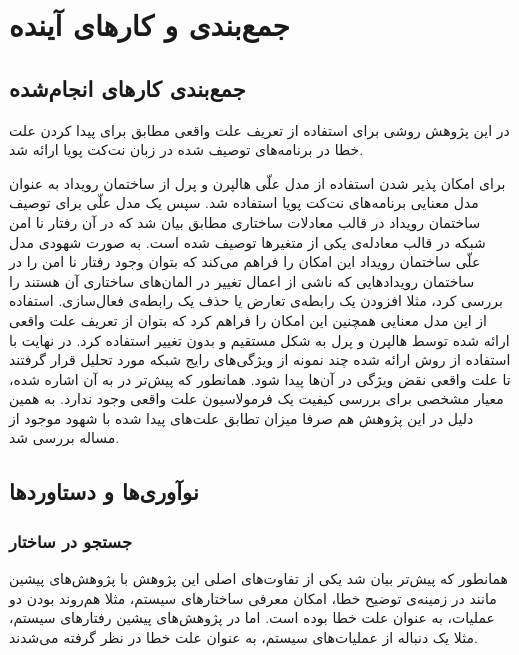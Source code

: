 \chapter{جمع‌بندی و کار‌های آینده}
\section{جمع‌بندی کار‌های انجام‌شده}
 در این پژوهش روشی برای استفاده از تعریف علت واقعی مطابق
\cite{hp}
برای پیدا کردن علت خطا در برنامه‌های توصیف شده در زبان نت‌کت پویا ارائه شد.

برای امکان پذیر شدن استفاده از مدل علّی هالپرن و پرل از ساختمان رویداد به عنوان مدل معنایی برنامه‌های نت‌کت پویا استفاده شد.
سپس یک مدل علّی برای توصیف ساختمان رویداد در قالب معادلات ساختاری مطابق
\cite{hp}
بیان شد که در آن رفتار نا امن شبکه در قالب معادله‌ی یکی از متغیر‌ها توصیف شده است.
به صورت شهودی مدل علّی ساختمان رویداد این امکان را فراهم می‌کند که بتوان وجود رفتار نا امن را در ساختمان رویداد‌هایی که ناشی از اعمال تغییر در المان‌های ساختاری آن هستند را بررسی کرد، مثلا افزودن یک رابطه‌ی تعارض یا حذف یک رابطه‌ی فعال‌سازی.
استفاده از این مدل معنایی همچنین این امکان را فراهم کرد که بتوان از تعریف علت واقعی ارائه شده توسط هالپرن و پرل به شکل مستقیم و بدون تغییر استفاده کرد.
در نهایت با استفاده از روش ارائه شده چند نمونه از ویژگی‌های رایج شبکه مورد تحلیل قرار گرفتند تا علت واقعی نقض ویژگی در آن‌ها پیدا شود.
همانطور که پیش‌تر در 
\cite{hp}
به آن اشاره شده، معیار مشخصی برای بررسی کیفیت یک فرمولاسیون علت واقعی وجود ندارد.  
به همین دلیل در این پژوهش هم صرفا میزان تطابق علت‌های پیدا شده با شهود موجود از مساله بررسی شد.  

 \section{نوآوری‌ها و دستاورد‌ها}

 \subsection{جستجو در ساختار}
همانطور که پیش‌تر بیان شد یکی از تفاوت‌های اصلی این پژوهش با پژوهش‌های پیشین مانند
\cite{causality-checking,chockler,causal-hml}
در زمینه‌ی توضیح خطا، امکان معرفی ساختار‌های سیستم، مثلا هم‌روند بودن دو عملیات، به عنوان علت خطا بوده است.
اما در پژوهش‌های پیشین رفتار‌های سیستم، مثلا یک دنباله از عملیات‌های سیستم، به عنوان علت خطا در نظر گرفته می‌شدند.


